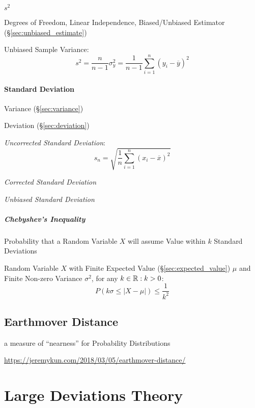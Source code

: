$s^2$

Degrees of Freedom, Linear Independence, Biased/Unbiased Estimator
(\S\ref{sec:unbiased_estimate})

Unbiased Sample Variance:
\[
  s^2 = \frac{n}{n-1}\sigma^2_y =
  \frac{1}{n-1} \sum_{i=1}^n (y_i - \overline{y})^2
\]



\paragraph{Standard Deviation}\label{sec:standard_deviation}\hfill

Variance (\S\ref{sec:variance})

Deviation (\S\ref{sec:deviation})

\emph{Uncorrected Standard Deviation}:
\[
  s_n = \sqrt{\frac{1}{n}\sum_{i=1}^n (x_i - \overline{x})^2}
\]

\emph{Corrected Standard Deviation}

\emph{Unbiased Standard Deviation}



\subparagraph{Chebyshev's Inequality}\label{sec:chebyshevs_inequality}
\hfill

Probability that a Random Variable $X$ will assume Value within $k$ Standard
Deviations

Random Variable $X$ with Finite Expected Value (\S\ref{sec:expected_value})
$\mu$ and Finite Non-zero Variance $\sigma^2$, for any $k \in \mathbb{R} : k > 0$:
\[
  P(k\sigma \leq |X - \mu|) \leq \frac{1}{k^2}
\]



\subsection{Earthmover Distance}\label{sec:earthmover_distance}


a measure of ``nearness'' for Probability Distributions

\url{https://jeremykun.com/2018/03/05/earthmover-distance/}



\section{Large Deviations Theory}\label{sec:large_deviations_theory}


